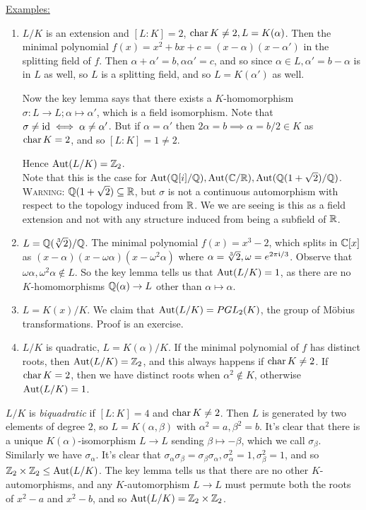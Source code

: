 \documentclass[10pt,a4paper]{article}
\begin{document}
\underline{Examples:}
\begin{enumerate}
\item $L/K$ is an extension and $[L:K] = 2$, $\operatorname{char} K \neq 2, L = K(\alpha)$. Then the minimal polynomial $f(x) = x^2 + bx + c = (x-\alpha)(x- \alpha')$ in the splitting field of $f$. Then $\alpha+\alpha' = b, \alpha\alpha' = c$, and so since $\alpha \in L, \alpha' = b-\alpha$ is in $L$ as well, so $L$ is a splitting field, and so $L=K(\alpha')$ as well.

Now the key lemma says that there exists a $K$-homomorphism $\sigma:L \to L; \alpha \mapsto \alpha'$, which is a field isomorphism. Note that $\sigma \neq \operatorname{id} \iff \alpha \neq \alpha'$. But if $\alpha = \alpha'$ then $2\alpha = b \implies \alpha = b/2 \in K$ as $\operatorname{char} K = 2$, and so $[L:K] = 1 \neq 2$.

Hence $\operatorname{Aut}(L/K) = \mathbb{Z}_2$. \\
Note that this is the case for $\operatorname{Aut}(\mathbb{Q}[i]/\mathbb{Q}), \operatorname{Aut}(\mathbb{C}/\mathbb{R}), \operatorname{Aut}(\mathbb{Q}(1+\sqrt{2})/\mathbb{Q})$.\\
\textsc{Warning:} $\mathbb{Q}(1+\sqrt{2})\subseteq \mathbb{R}$, but $\sigma$ is not a continuous automorphism with respect to the topology induced from $\mathbb{R}$. We we are seeing is this as a field extension and not with any structure induced from being a subfield of $\mathbb{R}$.

\item $L = \mathbb{Q}(\sqrt[3]{2}) / \mathbb{Q}$. The minimal polynomial $f(x) = x^3-2$, which splits in $\mathbb{C}[x]$ as $(x-\alpha)(x-\omega\alpha)(x-\omega^2\alpha)$ where $\alpha = \sqrt[3]{2}, \omega= e^{2\pi\mathfrak{i}/3}$. Observe that $\omega\alpha, \omega^2 \alpha \notin L$. So the key lemma tells us that $\operatorname{Aut}(L/K) = 1$, as there are no $K$-homomorphisms $\mathbb{Q}(\alpha) \to L$ other than $\alpha \mapsto \alpha$. 

\item $L=K(x)/K$. We claim that $\operatorname{Aut}(L/K) = PGL_2(K)$, the group of M\"obius transformations. Proof is an exercise.

\item $L/K$ is quadratic, $L=K(\alpha)/K$. If the minimal polynomial of $f$ has distinct roots, then $\operatorname{Aut}(L/K) = \mathbb{Z}_2$, and this always happens if $\operatorname{char} K \neq 2$. If $\operatorname{char} K = 2$, then we have distinct roots when $\alpha^2 \notin K$, otherwise $\operatorname{Aut}(L/K) = 1$.
\end{enumerate}
$L/K$ is \emph{biquadratic} if $[L:K] = 4$ and $\operatorname{char} K \neq 2$. Then $L$ is generated by two elements of degree $2$, so $L = K(\alpha, \beta)$ with $\alpha^2 = a, \beta^2 = b$.  It's clear that there is a unique $K(\alpha)$-isomorphism $L \to L$ sending $\beta \mapsto -\beta$, which we call $\sigma_\beta$. Similarly we have $\sigma_\alpha$. It's clear that $\sigma_\alpha \sigma_\beta = \sigma_\beta\sigma_\alpha, \sigma_\alpha^2=1, \sigma_\beta^2=1$, and so $\mathbb{Z}_2 \times \mathbb{Z}_2 \leq \operatorname{Aut}(L/K)$. The key lemma tells us that there are no other $K$-automorphisms, and any $K$-automorphism $L \to L$ must permute both the roots of $x^2-a$ and $x^2-b$, and so $\operatorname{Aut}(L/K) = \mathbb{Z}_2 \times \mathbb{Z}_2$.
\end{document}
